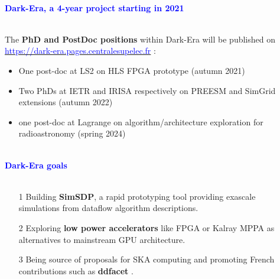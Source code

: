 \documentclass{beamer}
\renewenvironment{block}[1]{%
\begin{Sbox}%
\begin{minipage}[t]{\textwidth}
~\\
\textcolor{blue}{\quad #1}~\\
~\\%
\vspace{0.5cm}
} 
{%
\end{minipage}
\end{Sbox}\Ovalbox{\TheSbox}%
}
\begin{document}
{\begin{columns}[t]
\begin{column}{.49\linewidth}
\begin{block}{\large \textbf{Dark-Era, a 4-year project starting in 2021}}
\begin{minipage}{0.95\textwidth}
The \textbf{PhD and PostDoc positions} within Dark-Era will be published on \href{https://dark-era.pages.centralesupelec.fr}{\textcolor{blue}{https://dark-era.pages.centralesupelec.fr}} :
\begin{itemize}
    \item One post-doc at LS2 on HLS FPGA prototype (autumn 2021)
    \item Two PhDs at IETR and IRISA respectively on PREESM and SimGrid
    extensions (autumn 2022)
    \item one post-doc at Lagrange on algorithm/architecture exploration for radioastronomy (spring 2024)
\end{itemize}
 \end{minipage}
\end{block}

\begin{block}{\large \textbf{Dark-Era goals}}
 \begin{minipage}{0.95\textwidth}
 \begin{itemize}
 \item[1] Building \textbf{SimSDP}, a rapid prototyping tool providing exascale simulations from dataflow algorithm descriptions.
 \item[2] Exploring \textbf{low power accelerators} like FPGA or Kalray MPPA as alternatives to mainstream GPU architecture.
 \item[3] Being source of proposals for SKA computing and promoting French contributions such as \textbf{ddfacet} \cite{Tasse18}.
 \end{itemize}
 \end{minipage}
\end{block}

\footnotesize{
         \begin{minipage}{.99\textwidth}
        
  	\end{minipage}
  	}
\end{column}
\begin{column}{.49\linewidth}


\end{column}
\end{columns}}
\end{document}
